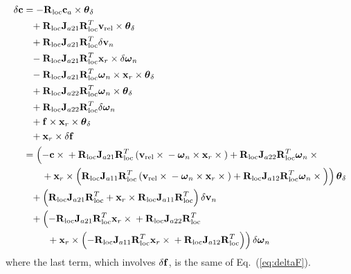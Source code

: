 \begin{align}
	\delta\bm{\mathbf{c}} &= 
	- \bm{\mathbf{R}}_{\text{loc}}\bm{\mathbf{c}}_a\times\bm{\mathbf{\theta}}_\delta
	\nonumber \\
	&\hphantom{= }+ \bm{\mathbf{R}}_{\text{loc}}\bm{\mathbf{J}}_{a21}\bm{\mathbf{R}}^T_{\text{loc}}\bm{\mathbf{v}}_{\text{rel}}\times\bm{\mathbf{\theta}}_\delta
	\nonumber \\
	&\hphantom{= }+ \bm{\mathbf{R}}_{\text{loc}}\bm{\mathbf{J}}_{a21}\bm{\mathbf{R}}^T_{\text{loc}}\delta\bm{\mathbf{v}}_n
	\nonumber \\
	&\hphantom{= }- \bm{\mathbf{R}}_{\text{loc}}\bm{\mathbf{J}}_{a21}\bm{\mathbf{R}}^T_{\text{loc}}
		\bm{\mathbf{x}}_r\times\delta\bm{\mathbf{\omega}}_n
	\nonumber \\
	&\hphantom{= }- \bm{\mathbf{R}}_{\text{loc}}\bm{\mathbf{J}}_{a21}\bm{\mathbf{R}}^T_{\text{loc}}
		\bm{\mathbf{\omega}}_n\times\bm{\mathbf{x}}_r\times\bm{\mathbf{\theta}}_\delta
	\nonumber \\
	&\hphantom{= }+ \bm{\mathbf{R}}_{\text{loc}}\bm{\mathbf{J}}_{a22}\bm{\mathbf{R}}^T_{\text{loc}}\bm{\mathbf{\omega}}_n
		\times\bm{\mathbf{\theta}}_\delta
	\nonumber \\
	&\hphantom{= }+ \bm{\mathbf{R}}_{\text{loc}}\bm{\mathbf{J}}_{a22}\bm{\mathbf{R}}^T_{\text{loc}}\delta\bm{\mathbf{\omega}}_n
	\nonumber \\
	&\hphantom{= }+ \bm{\mathbf{f}}\times\bm{\mathbf{x}}_r\times\bm{\mathbf{\theta}}_\delta
	\nonumber \\
	&\hphantom{= }+ \bm{\mathbf{x}}_r \times \delta\bm{\mathbf{f}}
	\nonumber \\
	&=
	\left( 
		- \bm{\mathbf{c}}\times{}
		+ \bm{\mathbf{R}}_{\text{loc}}\bm{\mathbf{J}}_{a21}\bm{\mathbf{R}}^T_{\text{loc}} \left( 
			\bm{\mathbf{v}}_{\text{rel}}\times{}
			- \bm{\mathbf{\omega}}_n\times\bm{\mathbf{x}}_r\times{}
		 \right)
		+ \bm{\mathbf{R}}_{\text{loc}}\bm{\mathbf{J}}_{a22}\bm{\mathbf{R}}^T_{\text{loc}}\bm{\mathbf{\omega}}_n\times{}
	 \right.
	\nonumber \\
	&\hphantom{= }\left. \mbox{\hspace{3mm}} + \bm{\mathbf{x}}_r \times 
	\left( 
		\bm{\mathbf{R}}_{\text{loc}}\bm{\mathbf{J}}_{a11}\bm{\mathbf{R}}^T_{\text{loc}}\left( 
			\bm{\mathbf{v}}_{\text{rel}}\times{}
			- \bm{\mathbf{\omega}}_n\times\bm{\mathbf{x}}_r\times{}
		 \right)
		+ \bm{\mathbf{R}}_{\text{loc}}\bm{\mathbf{J}}_{a12}\bm{\mathbf{R}}^T_{\text{loc}}\bm{\mathbf{\omega}}_n\times{}
	 \right) \right) \bm{\mathbf{\theta}}_\delta
	\nonumber \\
	&\hphantom{= }+ \left( 
		\bm{\mathbf{R}}_{\text{loc}}\bm{\mathbf{J}}_{a21}\bm{\mathbf{R}}^T_{\text{loc}}
		+ \bm{\mathbf{x}}_r \times \bm{\mathbf{R}}_{\text{loc}}\bm{\mathbf{J}}_{a11}\bm{\mathbf{R}}^T_{\text{loc}}
	 \right) \delta\bm{\mathbf{v}}_n
	\nonumber \\
	&\hphantom{= }+ \left( 
		- \bm{\mathbf{R}}_{\text{loc}}\bm{\mathbf{J}}_{a21}\bm{\mathbf{R}}^T_{\text{loc}}\bm{\mathbf{x}}_r\times{}
		+ \bm{\mathbf{R}}_{\text{loc}}\bm{\mathbf{J}}_{a22}\bm{\mathbf{R}}^T_{\text{loc}}
	 \right.
	\nonumber \\
	&\hphantom{= } \left. 
		\mbox{\hspace{5mm}} + \bm{\mathbf{x}}_r \times \left( 
		- \bm{\mathbf{R}}_{\text{loc}}\bm{\mathbf{J}}_{a11}\bm{\mathbf{R}}^T_{\text{loc}} \bm{\mathbf{x}}_r\times{}
		+ \bm{\mathbf{R}}_{\text{loc}}\bm{\mathbf{J}}_{a12}\bm{\mathbf{R}}^T_{\text{loc}}
	 \right) \right) \delta\bm{\mathbf{\omega}}_n
\end{align}
where the last term, which involves $\delta\bm{\mathbf{f}}$, is the same of
Eq.~(\ref{eq:deltaF}).


